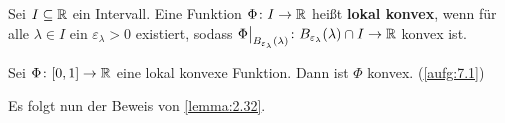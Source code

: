 \begin{definition}
\label{def:2.51}
	Sei $I \subseteq \mathbb{R}$ ein Intervall.
	Eine Funktion $\Phi \colon I \rightarrow \mathbb{R}$ heißt \textbf{lokal konvex}, wenn für alle $\lambda \in I$ ein $\varepsilon_\lambda > 0$ existiert, sodass $\Phi \big|_{B_{\varepsilon_\lambda}(\lambda)} \colon B_{\varepsilon_\lambda}(\lambda) \cap I \rightarrow \mathbb{R}$ konvex ist. 
\end{definition}

\begin{lemma}
\label{lemma:2.52}
	Sei $\Phi\colon [0,1] \rightarrow \mathbb{R}$ eine lokal konvexe Funktion.
	Dann ist $\Phi$ konvex. (\autoref{aufg:7.1})
\end{lemma}

Es folgt nun der Beweis von \autoref{lemma:2.32}.

